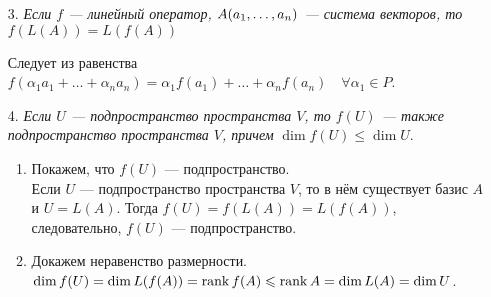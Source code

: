 \begin{enumerate}
	\item[3.] \textit{Если $f$ --- линейный оператор, $A(a_1,\dots,a_n)$ --- система векторов, то $f(L(A)) = L(f(A))$} \begin{Proof} Следует из равенства
		$f(\alpha_1 a_1 + \ldots + \alpha_n a_n) = \alpha_1 f(a_1) + \ldots + \alpha_n f(a_n)\quad \forall\alpha_1 \in P$.
	\end{Proof}
	\item[4.] \textit{Если $U$ --- подпространство пространства $V$, то $f(U)$ --- также подпространство пространства $V$, причем} $\dim f(U) \leqslant \dim U.$
	\begin{Proof}
		\begin{enumerate}
			\item Покажем, что $f(U)$ --- подпространство.\\
			Если $U$ --- подпространство пространства $V$, то в нём существует базис $A$ и $U = L(A)$. Тогда $f(U) = f(L(A)) = L(f(A))$, следовательно, $f(U)$ --- подпространство.
			\item Докажем неравенство размерности.\\
			$\dim  f(U) = \dim  L(f(A)) = \operatorname{rank}  f(A) \leqslant \operatorname{rank}  A = \dim  L(A) = \dim  U$.
		\end{enumerate}
	\end{Proof}
\end{enumerate}









